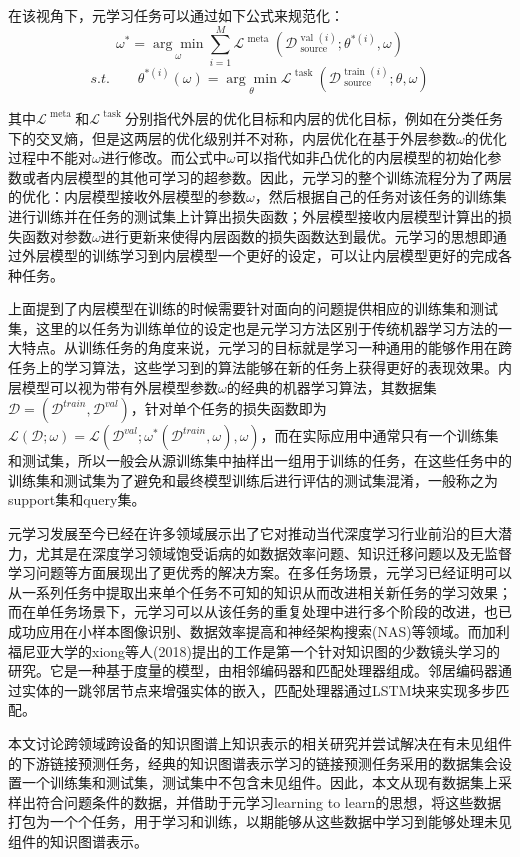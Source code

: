 在该视角下，元学习任务可以通过如下公式来规范化：
\begin{equation}
  \omega ^ { * } = \underset { \omega } { \operatorname { arg } \operatorname { min } } \sum_{i=1}^{M} \mathcal{L} ^ { \text { meta } } ( \mathcal{D} _ { \text { source } } ^ { \text { val } ( i ) } ; \theta ^ { * ( i ) } , \omega ) \label{eq:2-7}
\end{equation}
\begin{equation}
  s.t. \qquad \theta ^ { * ( i ) } ( \omega ) = \underset { \theta } { \operatorname { arg } \operatorname { min } } \mathcal{L} ^ { \text { task } } ( \mathcal{D} _ { \text { source } } ^ { \text { train } ( i ) } ; \theta , \omega ) \label{eq:2-8}
\end{equation}

其中\(\mathcal{L} ^ { \text { meta } }\)和\(\mathcal{L} ^ { \text { task } }\)分别指代外层的优化目标和内层的优化目标，例如在分类任务下的交叉熵，但是这两层的优化级别并不对称，内层优化在基于外层参数\(\omega\)的优化过程中不能对\(\omega\)进行修改。而公式中\(\omega\)可以指代如非凸优化\cite{finn2017model}的内层模型的初始化参数或者内层模型的其他可学习的超参数。因此，元学习的整个训练流程分为了两层的优化：内层模型接收外层模型的参数\(\omega\)，然后根据自己的任务对该任务的训练集进行训练并在任务的测试集上计算出损失函数；外层模型接收内层模型计算出的损失函数对参数\(\omega\)进行更新来使得内层函数的损失函数达到最优。元学习的思想即通过外层模型的训练学习到内层模型一个更好的设定，可以让内层模型更好的完成各种任务。

上面提到了内层模型在训练的时候需要针对面向的问题提供相应的训练集和测试集，这里的以任务为训练单位的设定也是元学习方法区别于传统机器学习方法的一大特点。从训练任务的角度来说，元学习的目标就是学习一种通用的能够作用在跨任务上的学习算法，这些学习到的算法能够在新的任务上获得更好的表现效果。内层模型可以视为带有外层模型参数\(\omega\)的经典的机器学习算法，其数据集 \(\mathcal{D} = (\mathcal{D}^{train}, \mathcal{D}^{val})\)，针对单个任务的损失函数即为\(\mathcal{L}(\mathcal{D};\omega) = \mathcal{L}(\mathcal{D}^{val};\omega^{*}(\mathcal{D}^{train},\omega),\omega)\)，而在实际应用中通常只有一个训练集和测试集，所以一般会从源训练集中抽样出一组用于训练的任务，在这些任务中的训练集和测试集为了避免和最终模型训练后进行评估的测试集混淆，一般称之为support集和query集。

元学习发展至今已经在许多领域展示出了它对推动当代深度学习行业前沿的巨大潜力，尤其是在深度学习领域饱受诟病的如数据效率问题、知识迁移问题以及无监督学习问题\cite{marcus2018deep}等方面展现出了更优秀的解决方案。在多任务场景，元学习已经证明可以从一系列任务中提取出来单个任务不可知的知识从而改进相关新任务的学习效果\cite{thrun1998learning}；而在单任务场景下，元学习可以从该任务的重复处理中进行多个阶段的改进\cite{andrychowicz2016learning}\cite{liu2018darts}\cite{zhou2020online}，也已成功应用在小样本图像识别\cite{snell2017prototypical}、数据效率提高\cite{houthooft2018evolved}和神经架构搜索(NAS)\cite{real2019regularized}等领域。而加利福尼亚大学的xiong等人(2018)\cite{xiong2018one}提出的工作是第一个针对知识图的少数镜头学习的研究。它是一种基于度量的模型，由相邻编码器和匹配处理器组成。邻居编码器通过实体的一跳邻居节点来增强实体的嵌入，匹配处理器通过LSTM块来实现多步匹配。

本文讨论跨领域跨设备的知识图谱上知识表示的相关研究并尝试解决在有未见组件的下游链接预测任务，经典的知识图谱表示学习的链接预测任务采用的数据集会设置一个训练集和测试集，测试集中不包含未见组件。因此，本文从现有数据集上采样出符合问题条件的数据，并借助于元学习learning to learn的思想，将这些数据打包为一个个任务，用于学习和训练，以期能够从这些数据中学习到能够处理未见组件的知识图谱表示。 